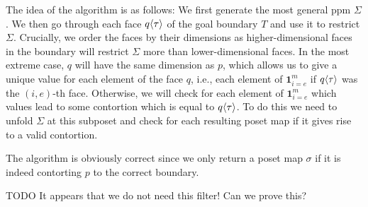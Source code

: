 \documentclass{llncs}
\newcommand{\todo}[1]{
  \begin{tcolorbox}
    TODO {#1} 
  \end{tcolorbox}
}
\newcommand{\mdef}{:=}
\newcommand{\pint}[1]{\mathbf{1}^{#1}}
\newcommand{\pintrestr}[3]{\mathbf{1}^{#1}_{{#2}={#3}}}
\newcommand{\izero}{\mathsf{0}}
\newcommand{\ione}{\mathsf{1}}
\renewcommand{\dim}[1]{\mathsf{dim}({#1})}
\newcommand{\cont}[2]{\ensuremath{ \ifthenelse{\equal{#2}{}}{#1}{{#1}\langle{#2}\rangle}} }
\newcommand{\boundary}[1]{\partial({#1})}
\begin{document}
The idea of the algorithm is as follows: We first generate the most general ppm
$\Sigma$. We then go through each face $\cont{q}{\tau}$ of the goal boundary $T$
and use it to restrict $\Sigma$. Crucially, we order the faces by their
dimensions as higher-dimensional faces in the boundary will restrict $\Sigma$
more than lower-dimensional faces. In the most extreme case, $q$ will have the
same dimension as $p$, which allows us to give a unique value for each element
of the face $q$, i.e., each element of $\pintrestr{m}{i}{e}$ if $\cont{q}{\tau}$ was
the $(i,e)$-th face. Otherwise, we will check for each element of $\pintrestr{m}{i}{e}$ which
values lead to some contortion which is equal to $\cont{q}{\tau}$. To do this we
need to unfold $\Sigma$ at this subposet and check for each resulting poset map
if it gives rise to a valid contortion.

The algorithm is obviously correct since we only return a poset map $\sigma$ if
it is indeed contorting $p$ to the correct boundary.

\todo{It appears that we do not need this filter! Can we prove this?}



\end{document}
